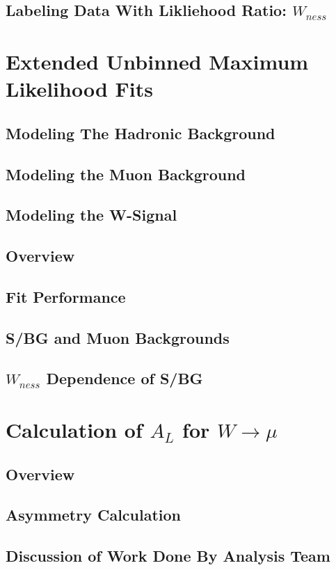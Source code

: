 \subsection{Labeling Data With Likliehood Ratio: $W_{ness}$}
\label{likelihood}
\section{Extended Unbinned Maximum Likelihood Fits}
\subsection{Modeling The Hadronic Background}
\subsection{Modeling the Muon Background}
\subsection{Modeling the W-Signal}
\subsection{Overview}
\subsection{Fit Performance}
\subsection{S/BG and Muon Backgrounds}
\label{sbr}
\subsection{$W_{ness}$ Dependence of S/BG}
\section{Calculation of $A_{L}$ for $W\rightarrow\mu$}
\subsection{Overview}
\subsection{Asymmetry Calculation}
\subsection{Discussion of Work Done By Analysis Team}
